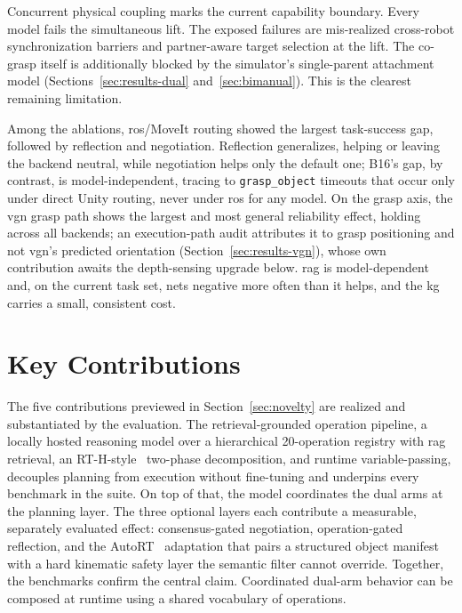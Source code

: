 Concurrent physical coupling marks the current capability boundary. Every model fails the simultaneous lift. The exposed failures are mis-realized cross-robot synchronization barriers and partner-aware target selection at the lift. The co-grasp itself is additionally blocked by the simulator’s single-parent attachment model (Sections~\ref{sec:results-dual} and~\ref{sec:bimanual}). This is the clearest remaining limitation.

Among the ablations, \gls{ros}/MoveIt routing showed the largest task-success gap, followed by reflection and negotiation. Reflection generalizes, helping or leaving the backend neutral, while negotiation helps only the default one; B16's gap, by contrast, is model-independent, tracing to \texttt{grasp\_object} timeouts that occur only under direct Unity routing, never under \gls{ros} for any model. On the grasp axis, the \gls{vgn} grasp path shows the largest and most general reliability effect, holding across all backends; an execution-path audit attributes it to grasp positioning and not \gls{vgn}'s predicted orientation (Section~\ref{sec:results-vgn}), whose own contribution awaits the depth-sensing upgrade below. \gls{rag} is model-dependent and, on the current task set, nets negative more often than it helps, and the \gls{kg} carries a small, consistent cost.

\section{Key Contributions}
The five contributions previewed in Section~\ref{sec:novelty} are realized and substantiated by the evaluation. The retrieval-grounded operation pipeline, a locally hosted reasoning model over a hierarchical 20-operation registry with \gls{rag} retrieval, an RT-H-style~\cite{belkhale2024rthactionhierarchiesusing} two-phase decomposition, and runtime variable-passing, decouples planning from execution without fine-tuning and underpins every benchmark in the suite. On top of that, the model coordinates the dual arms at the planning layer. The three optional layers each contribute a measurable, separately evaluated effect: consensus-gated negotiation, operation-gated reflection, and the AutoRT~\cite{ahn2024autortembodiedfoundationmodels} adaptation that pairs a structured object manifest with a hard kinematic safety layer the semantic filter cannot override. Together, the benchmarks confirm the central claim. Coordinated dual-arm behavior can be composed at runtime using a shared vocabulary of operations.


